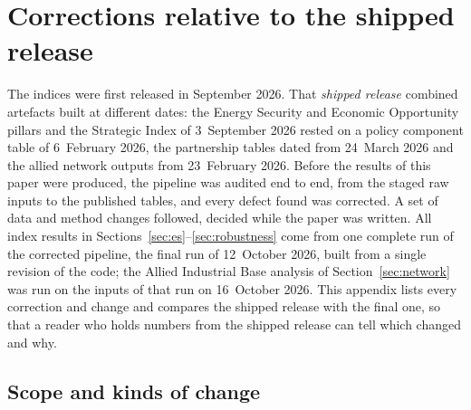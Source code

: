 \section{Corrections relative to the shipped release}
\label{app:corrections}

The indices were first released in September 2026. That \emph{shipped release} combined artefacts
built at different dates: the Energy Security and Economic Opportunity pillars and the Strategic
Index of 3~September 2026 rested on a policy component table of 6~February 2026, the partnership
tables dated from 24~March 2026 and the allied network outputs from 23~February 2026. Before the
results of this paper were produced, the pipeline was audited end to end, from the staged raw
inputs to the published tables, and every defect found was corrected. A set of data and method
changes followed, decided while the paper was written. All index results in
Sections~\ref{sec:es}--\ref{sec:robustness} come from one complete run of the corrected pipeline,
the final run of 12~October 2026, built from a single revision of the code; the Allied Industrial
Base analysis of Section~\ref{sec:network} was run on the inputs of that run on 16~October 2026. This appendix lists
every correction and change and compares the shipped release with the final one, so that a reader
who holds numbers from the shipped release can tell which changed and why.

\subsection{Scope and kinds of change}
\label{subsec:corr_scope}

